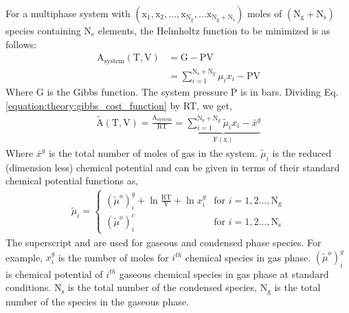 \documentclass[letterpaper,10pt,english]{sphinxmanual}
\begin{document}
For a multi\sphinxhyphen{}phase system with \(\mathrm{(x_1, x_2,\ldots, x_{N_g},\ldots
x_{N_g + N_s})}\) moles of \(\mathrm{(N_g + N_s)}\) species containing
\(\mathrm{N_e}\) elements, the Helmholtz function to be minimized is as
follows:
\begin{equation}\label{equation:theory:gibbs_cost_function}
\begin{split}\mathrm{A_{system}(T, V)} & = \mathrm{G - PV}\\
            & = \sum_{i = 1}^{\mathrm{N_s + N_g}}
            \mu_i x_i - \mathrm{PV}\end{split}
\end{equation}
Where G is the Gibbs function. The system pressure P is in
bars. Dividing Eq. \eqref{equation:theory:gibbs_cost_function} by RT, we get,
\begin{equation}\label{equation:theory:Atilde}
\begin{split}\mathrm{\tilde{A}(T, V)} = \frac{\mathrm{A_{system}}}{\mathrm{RT}}
= \underbrace{\sum_{i = 1}^{\mathrm{N_s + N_g}}\tilde{\mu}_i x_i -
\bar{x}^g}_{\mathrm{F(x)}}\end{split}
\end{equation}
Where \(\bar{x}^g\) is the total number of moles of gas in the system.
\(\tilde{\mu}_i\) is the reduced (dimension less) chemical
potential and can be given in terms of their standard chemical potential
functions as,
\begin{equation}\label{equation:theory:chem_pot}
\begin{split}\tilde{\mu}_i =
\begin{cases}
    {\left(\tilde{\mu}^o\right)}_i^g + \ln\mathrm{\frac{RT}{V}}
    + \ln x_i^g & \text{for }i = 1, 2 \ldots, \mathrm{N_g} \\
    {\left(\tilde{\mu}^{o}\right)}_{i}^{c} &
     \text{for }i = 1,2\ldots,\mathrm{N_s}
\end{cases}\end{split}
\end{equation}
The superscript  and  are used for gaseous and condensed phase
species. For example, \(x_{i}^{g}\) is the number of moles for
\(i^{th}\) chemical species in gas phase.
\({\left(\tilde{\mu}^o\right)}_{i}^{g}\) is chemical potential
of \(i^{th}\) gaseous chemical species in gas phase at standard
conditions. \(\mathrm{N_s}\) is the total number of the condensed species,
\(\mathrm{N_g}\) is the total number of the species in the gaseous phase.
\end{document}
